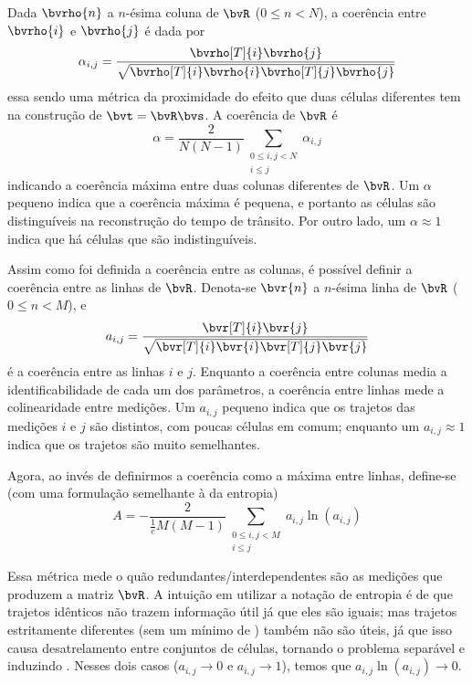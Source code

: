 Dada $\bvrho{n}$ a $n$-ésima coluna de $\bvR$ ($0 \leq n < N$), a coerência entre $\bvrho{i}$ e $\bvrho{j}$ é dada por
\begin{equation}
	\alpha_{i,j} = \frac{\bvrho[T]{i} \bvrho{j}}{\sqrt{\bvrho[T]{i}\bvrho{i} \bvrho[T]{j} \bvrho{j}}}
\end{equation}
essa sendo uma métrica da proximidade do efeito que duas células diferentes tem na construção de $\bvt = \bvR \bvs$. A coerência de $\bvR$ é
\begin{equation}
	\alpha = \frac{2}{N(N-1)} \sum_{\substack{0 \leq i,j < N\\i \leq j}} \alpha_{i,j}
\end{equation}
indicando a coerência máxima entre duas colunas diferentes de $\bvR$. Um $\alpha$ pequeno indica que a coerência máxima é pequena, e portanto as células são distinguíveis na reconstrução do tempo de trânsito. Por outro lado, um $\alpha \approx 1$ indica que há células que são indistinguíveis.

Assim como foi definida a coerência entre as colunas, é possível definir a coerência entre as linhas de $\bvR$. Denota-se $\bvr{n}$ a $n$-ésima linha de $\bvR$ ($0 \leq n < M$), e
\begin{equation}
	a_{i,j} = \frac{\bvr[T]{i} \bvr{j}}{\sqrt{\bvr[T]{i}\bvr{i} \bvr[T]{j} \bvr{j}}}
\end{equation}
é a coerência entre as linhas $i$ e $j$. Enquanto a coerência entre colunas media a identificabilidade de cada um dos parâmetros, a coerência entre linhas mede a colinearidade entre medições. Um $a_{i,j}$ pequeno indica que os trajetos das medições $i$ e $j$ são distintos, com poucas células em comum; enquanto um $a_{i,j} \approx 1$ indica que os trajetos são muito semelhantes.

 Agora, ao invés de definirmos a coerência como a máxima entre linhas, define-se (com uma formulação semelhante à da entropia)
\begin{equation}
	A = -\frac{2}{\frac{1}{e} M(M-1)} \sum_{\substack{0\leq i,j < M\\i\leq j}} a_{i,j} \ln (a_{i,j})
\end{equation}

Essa métrica mede o quão redundantes/interdependentes são as medições que produzem a matriz $\bvR$. A intuição em utilizar a notação de entropia é de que trajetos idênticos não trazem informação útil já que eles são iguais; mas trajetos estritamente diferentes (sem um mínimo de ) também não são úteis, já que isso causa desatrelamento entre conjuntos de células, tornando o problema separável e induzindo . Nesses dois casos ($a_{i,j} \to 0$ e $a_{i,j} \to 1$), temos que $a_{i,j} \ln (a_{i,j}) \to 0$.

